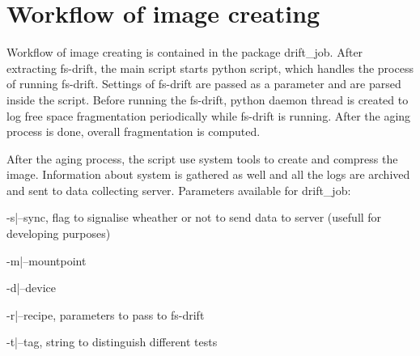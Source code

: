 \documentclass[
  color, %
  table, %
  lof,   %
  lot,   %
]{fithesis3}
\begin{document}


\section{Workflow of image creating}
Workflow of image creating is contained in the package drift\_job. After extracting fs-drift, the main script starts python script, which handles the process of running fs-drift. Settings of fs-drift are passed as a parameter and are parsed inside the script. Before running the fs-drift, python daemon thread is created to log free space fragmentation periodically while fs-drift is running. After the aging process is done, overall fragmentation is computed.

After the aging process, the script use system tools to create and compress the image. Information about system is gathered as well and all the logs are archived and sent to data collecting server.
Parameters available for drift\_job:
\begin{compactenum}
  \item -s|--sync, flag to signalise wheather or not to send data to server (usefull for developing purposes)
  \item -m|--mountpoint
  \item -d|--device
  \item -r|--recipe, parameters to pass to fs-drift
  \item -t|--tag, string to distinguish different tests
  \end{compactenum}
\end{document}

